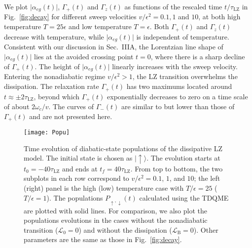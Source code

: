 \documentclass[english,nofootinbib, pra, twocolumn,superscriptaddress]{revtex4-1}
\begin{document}
We plot $\vert\alpha_{eg}(t)\vert$, $\Gamma_{+}(t)$ and $\Gamma_{z}(t)$
as functions of the rescaled time $t/\tau_{\text{LZ}}$ in Fig.~\ref{fig:decay}
for different sweep velocities $v/\epsilon^{2}=0.1,1$ and $10$,
at both high temperature $T=25\epsilon$ and low temperature
$T=\epsilon$. Both $\Gamma_{+}(t)$ and $\Gamma_{z}(t)$ decrease
with temperature, while $\vert\alpha_{eg}(t)\vert$ is independent of temperature.
Consistent with our discussion in Sec.~IIIA, the Lorentzian line shape of $\vert\alpha_{eg}(t)\vert$ lies at the avoided crossing
point $t=0$, where there is a sharp decline of $\Gamma_{+}(t)$. The
height of $\vert\alpha_{eg}(t)\vert$ linearly increases with the sweep
velocity. Entering the nonadiabatic regime $v/\epsilon^{2}>1$,
the LZ transition overwhelms the dissipation. The relaxation rate
$\Gamma_{+}(t)$ has two maximums located around $t\approx\pm2\tau_{\text{LZ}}$,
beyond which $\Gamma_{+}(t)$ exponentially decreases to zero on a
time scale of about $2\omega_{c}/v$. The curves of $\Gamma_{-}(t)$
are similar to but lower than those of $\Gamma_{+}(t)$ and are not presented here. 

\begin{figure*}
\texttt{[image: Popu]}
\caption{Time evolution of diabatic-state populations of the dissipative LZ
model. The initial state is chosen as $\vert\uparrow\rangle$. The
evolution starts at $t_{0}=-40\tau_{\text{LZ}}$ and ends at $t_{f}=40\tau_{\text{LZ}}$.
From top to bottom, the two subplots in each row correspond to $v/\epsilon^{2}=0.1$,
$1$, and $10$; the left (right) panel is the high (low)
temperature case with $T/\epsilon=25$ ($T/\epsilon=1$). The populations
$P_{\uparrow,\downarrow}(t)$ calculated using the TDQME are plotted
with solid lines. For comparison, we also plot the populations evolutions
in the cases without the nonadiabatic transition ($\mathcal{L}_{\text{0}}=0$)
and without the dissipation ($\mathcal{L}_{\text{B}}=0$).
Other parameters are the same as those in Fig.~\ref{fig:decay}.}
\label{fig:evolution}
\end{figure*}
\end{document}
